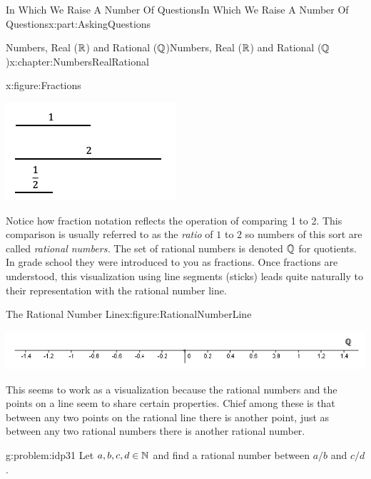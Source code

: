 \begin{partptx}{In Which We Raise A Number Of Questions}{}{In Which We Raise A Number Of Questions}{}{}{x:part:AskingQuestions}
\begin{chapterptx}{Numbers, Real (\(\mathbb {R}\)) and Rational (\(\mathbb {Q}\))}{}{Numbers, Real (\(\mathbb {R}\)) and Rational (\(\mathbb {Q}\))}{}{}{x:chapter:NumbersRealRational}
\begin{introduction}{}
			\begin{figureptx}{}{x:figure:Fractions}{}%
				\begin{image}{0.125}{0.75}{0.125}%
					\includegraphics[width=\linewidth]{external/images/Fractions.png}
				\end{image}%
				\tcblower
			\end{figureptx}%
			Notice how fraction notation reflects the operation of comparing 1 to 2.  This comparison is usually referred to as the \emph{ratio} of \(1\) to \(2\) so numbers of this sort are called \emph{rational numbers.} The set of rational numbers is denoted \(\mathbb {Q}\) for quotients.  In grade school they were introduced to you as fractions.  Once fractions are understood, this visualization using line segments (sticks) leads quite naturally to their representation with the rational number line.%
			\begin{figureptx}{The Rational Number Line}{x:figure:RationalNumberLine}{}%
				\begin{image}{0}{1}{0}%
					\includegraphics[width=\linewidth]{external/images/RationalNumberLine.png}
				\end{image}%
				\tcblower
			\end{figureptx}%
			This seems to work as a visualization because the rational numbers and the points on a line seem to share certain properties.  Chief among these is that between any two points on the rational line there is another point, just as between any two rational numbers there is another rational number.%
			\begin{problem}{}{g:problem:idp31}%
				 Let \(a, b, c, d\in\mathbb {N}\) and find a rational number between \(a/b\) and \(c/d\).%

\end{problem}
\end{introduction}
\end{chapterptx}
\end{partptx}
